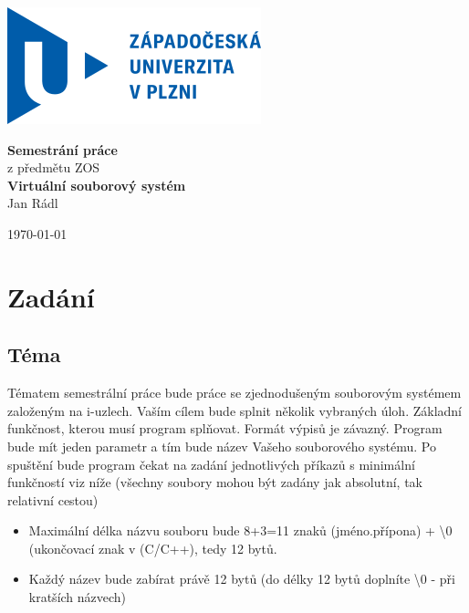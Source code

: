 \documentclass[12pt, a4paper]{report}
\begin{document}
\begin{titlepage}
\includegraphics{logo}
\enlargethispage{25mm}
\addtolength{\topmargin}{-8mm}
\thispagestyle{empty}
\vspace*{\fill}
\begin{center}
      {\Huge \bf {Semestrání práce}}\\[0.2cm]
      { z předmětu ZOS}\\[0.1cm]
      {\large \bf Virtuální souborový systém}\\[0.5cm]
      
      {\Large Jan Rádl}\\[0.4cm]
\end{center}
\vspace*{\fill}
\begin{flushright}
\vfill
\today
\end{flushright}
\end{titlepage}

\tableofcontents




\chapter{Zadání}
\section{Téma}
Tématem semestrální práce bude práce se zjednodušeným souborovým systémem založeným na
i-uzlech. Vaším cílem bude splnit několik vybraných úloh.
Základní funkčnost, kterou musí program splňovat. Formát výpisů je závazný.
Program bude mít jeden parametr a tím bude název Vašeho souborového systému. Po spuštění bude
program čekat na zadání jednotlivých příkazů s minimální funkčností viz níže (všechny soubory
mohou být zadány jak absolutní, tak relativní cestou)
\begin{itemize}
\item Maximální délka názvu souboru bude 8+3=11 znaků (jméno.přípona) + {\textbackslash}0 (ukončovací znak v (C/C++), tedy 12 bytů.
 \item Každý název bude zabírat právě 12 bytů (do délky 12 bytů doplníte \textbackslash0 - při kratších názvech)
\end{itemize}
\end{document}
